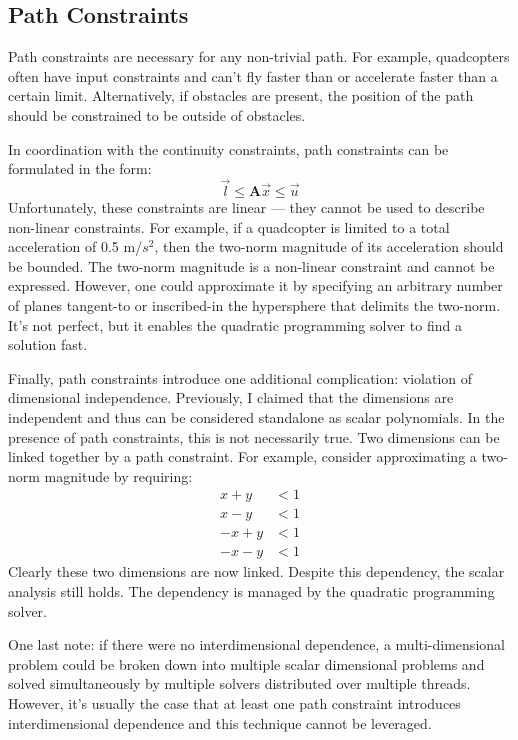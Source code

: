 \documentclass[12pt]{article}
\begin{document}
\subsection{Path Constraints}
Path constraints are necessary for any non-trivial path. For example, quadcopters
often have input constraints and can't fly faster than or accelerate faster than
a certain limit. Alternatively, if obstacles are present, the position of the
path should be constrained to be outside of obstacles.

In coordination with the continuity constraints, path constraints can be
formulated in the form:
\begin{equation*}
  \vec{l} \leq \mathbf{A} \vec{x} \leq \vec{u}
\end{equation*}
Unfortunately, these constraints are linear --- they cannot be used to describe
non-linear constraints. For example, if a quadcopter is limited to a total
acceleration of 0.5 m/$s^2$, then the two-norm magnitude of its acceleration
should be bounded. The two-norm magnitude is a non-linear constraint and cannot
be expressed. However, one could approximate it by specifying an arbitrary number of planes
tangent-to or inscribed-in the hypersphere that delimits the two-norm. It's not
perfect, but it enables the quadratic programming solver to find a solution
fast.

Finally, path constraints introduce one additional complication: violation of
dimensional independence. Previously, I claimed that the dimensions are
independent and thus can be considered standalone as scalar polynomials. In the
presence of path constraints, this is not necessarily true. Two dimensions can
be linked together by a path constraint. For example, consider approximating a
two-norm magnitude by requiring:
\begin{align*}
  x + y &< 1 \\
  x - y &< 1 \\
  -x + y &< 1 \\
  -x - y &< 1
\end{align*}
Clearly these two dimensions are now linked. Despite this dependency, the scalar
analysis still holds. The dependency is managed by the quadratic programming
solver.

One last note: if there were no interdimensional dependence, a multi-dimensional
problem could be broken down into multiple scalar dimensional problems and
solved simultaneously by multiple solvers distributed over multiple threads.
However, it's usually the case that at least one path constraint introduces
interdimensional dependence and this technique cannot be leveraged.
\end{document}
